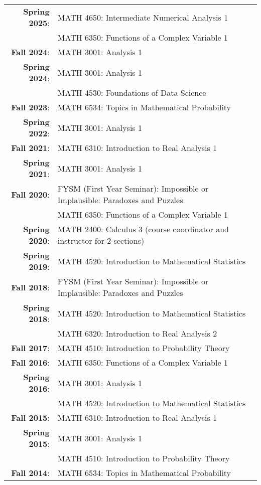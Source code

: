 \documentclass[letterpaper]{article}
\begin{document}
   \begin{tabular}{r l}
   	{\bf Spring 2025}: & MATH 4650: Intermediate Numerical Analysis 1 \\
			&  MATH 6350: Functions of a Complex Variable 1 \\
   	{\bf Fall 2024}: & MATH 3001: Analysis 1 \\
   	{\bf Spring 2024}: & MATH 3001: Analysis 1 \\
			& MATH 4530: Foundations of Data Science \\
   	{\bf Fall 2023}: & MATH 6534: Topics in Mathematical Probability \\
   	{\bf Spring 2022}: & MATH 3001: Analysis 1 \\
   	{\bf Fall 2021}: & MATH 6310: Introduction to Real Analysis 1 \\
         {\bf Spring 2021}: & MATH 3001: Analysis 1 \\
   	{\bf Fall 2020}: & FYSM (First Year Seminar): Impossible or Implausible: Paradoxes and Puzzles \\
			     & MATH 6350: Functions of a Complex Variable 1 \\
   	{\bf Spring 2020}: & MATH 2400: Calculus 3 (course coordinator and instructor for $2$ sections)  \\
   	{\bf Spring 2019}: & MATH 4520: Introduction to Mathematical Statistics \\
   	{\bf Fall 2018}: & FYSM (First Year Seminar): Impossible or Implausible: Paradoxes and Puzzles \\
   	{\bf Spring 2018}: & MATH 4520: Introduction to Mathematical Statistics \\
				& MATH 6320: Introduction to Real Analysis 2 \\
   	{\bf Fall 2017}: & MATH 4510: Introduction to Probability Theory \\
   	{\bf Fall 2016}: & MATH 6350: Functions of a Complex Variable 1 \\
   	{\bf Spring 2016}: & MATH 3001: Analysis 1 \\
				& MATH 4520: Introduction to Mathematical Statistics \\
   	{\bf Fall 2015}: & MATH 6310: Introduction to Real Analysis 1 \\
   	{\bf Spring 2015}: & MATH 3001: Analysis 1 \\
				& MATH 4510: Introduction to Probability Theory \\
   	{\bf Fall 2014}: &  MATH 6534: Topics in Mathematical Probability
   \end{tabular}
   
\end{document}
